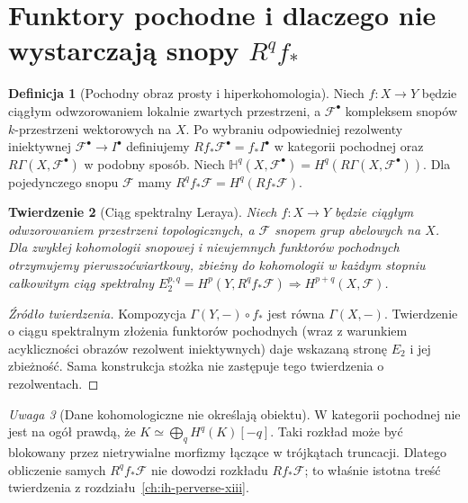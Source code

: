 \documentclass[11pt,a4paper,oneside]{report}
\theoremstyle{plain}
\newtheorem{twierdzenie}{Twierdzenie}[section]
\theoremstyle{definition}
\newtheorem{definicja}[twierdzenie]{Definicja}
\theoremstyle{remark}
\newtheorem{uwaga}[twierdzenie]{Uwaga}
\begin{document}
\section{Funktory pochodne i dlaczego nie wystarczają snopy \texorpdfstring{$R^qf_*$}{Rq f*}}
\begin{definicja}[Pochodny obraz prosty i hiperkohomologia]
Niech $f:X\to Y$ będzie ciągłym odwzorowaniem
lokalnie zwartych przestrzeni, a $\mathcal F^\bullet$
kompleksem snopów $k$-przestrzeni wektorowych na $X$.
Po wybraniu odpowiedniej rezolwenty iniektywnej
$\mathcal F^\bullet\to I^\bullet$ definiujemy
$Rf_*\mathcal F^\bullet=f_*I^\bullet$ w kategorii pochodnej
oraz $R\Gamma(X,\mathcal F^\bullet)$ w podobny sposób.
Niech $\mathbb H^q(X,\mathcal F^\bullet)=
H^q(R\Gamma(X,\mathcal F^\bullet))$.
Dla pojedynczego snopu $\mathcal F$ mamy
$R^qf_*\mathcal F=H^q(Rf_*\mathcal F)$.
\end{definicja}
\begin{twierdzenie}[Ciąg spektralny Leraya]
\label{thm:leray-derived-xiv}
Niech $f:X\to Y$ będzie ciągłym odwzorowaniem
przestrzeni topologicznych, a $\mathcal F$ snopem grup
abelowych na $X$. Dla zwykłej kohomologii snopowej
i nieujemnych funktorów pochodnych otrzymujemy
pierwszoćwiartkowy, zbieżny do kohomologii w każdym
stopniu całkowitym ciąg spektralny
$E_2^{p,q}=H^p(Y,R^qf_*\mathcal F)
\Rightarrow H^{p+q}(X,\mathcal F)$.
\end{twierdzenie}
\begin{proof}[Źródło twierdzenia]
Kompozycja $\Gamma(Y,-)\circ f_*$ jest równa
$\Gamma(X,-)$. Twierdzenie o ciągu spektralnym
złożenia funktorów pochodnych (wraz z warunkiem
acykliczności obrazów rezolwent iniektywnych)
daje wskazaną stronę $E_2$ i jej zbieżność.
Sama konstrukcja stożka nie zastępuje tego
twierdzenia o rezolwentach.
\end{proof}
\begin{uwaga}[Dane kohomologiczne nie określają obiektu]
W kategorii pochodnej nie jest na ogół prawdą, że
$K\simeq\bigoplus_qH^q(K)[-q]$.
Taki rozkład może być blokowany przez nietrywialne
morfizmy łączące w trójkątach truncacji.
Dlatego obliczenie samych $R^qf_*\mathcal F$ nie dowodzi
rozkładu $Rf_*\mathcal F$; to właśnie istotna treść
twierdzenia z rozdziału~\ref{ch:ih-perverse-xiii}.
\end{uwaga}
\end{document}
